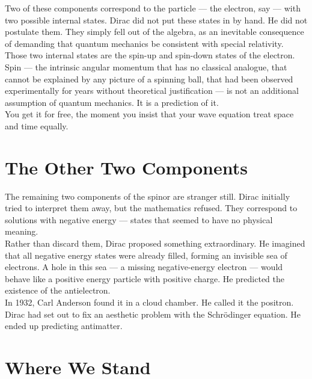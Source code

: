 \documentclass[krantz1,ChapterTOCs]{krantz}
\begin{document}
Two of these components correspond to the particle --- the electron,
say --- with two possible internal states. Dirac did not put these
states in by hand. He did not postulate them. They simply fell out
of the algebra, as an inevitable consequence of demanding that
quantum mechanics be consistent with special relativity.\\

Those two internal states are the spin-up and spin-down states of
the electron. Spin --- the intrinsic angular momentum that has no
classical analogue, that cannot be explained by any picture of a
spinning ball, that had been observed experimentally for years
without theoretical justification --- is not an additional
assumption of quantum mechanics. It is a prediction of it.\\

You get it for free, the moment you insist that your wave equation
treat space and time equally.\\

\section*{The Other Two Components}

The remaining two components of the spinor are stranger still.
Dirac initially tried to interpret them away, but the mathematics
refused. They correspond to solutions with negative energy ---
states that seemed to have no physical meaning.\\

Rather than discard them, Dirac proposed something extraordinary.
He imagined that all negative energy states were already filled,
forming an invisible sea of electrons. A hole in this sea --- a
missing negative-energy electron --- would behave like a positive
energy particle with positive charge. He predicted the existence
of the antielectron.\\

In 1932, Carl Anderson found it in a cloud chamber. He called it
the positron.\\

Dirac had set out to fix an aesthetic problem with the
Schr\"{o}dinger equation. He ended up predicting antimatter.\\

\section*{Where We Stand}
\end{document}
